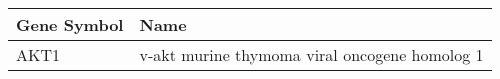 \begin{tabular}{ll}
\toprule
Gene Symbol &                                          Name \\
\midrule
       AKT1 & v-akt murine thymoma viral oncogene homolog 1 \\
\bottomrule
\end{tabular}
